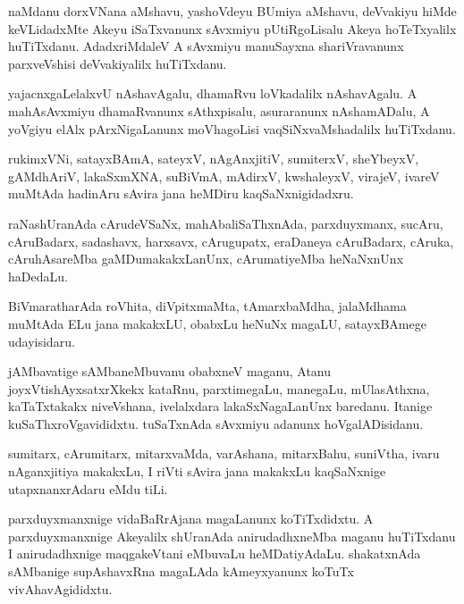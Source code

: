 \documentclass{article}
\begin{document}
\begin{mn}%
naMdanu dorxVNana aMshavu, yashoVdeyu BUmiya aMshavu, deVvakiyu hiMde
keVLidadxMte Akeyu iSaTxvanunx sAvxmiyu pUtiRgoLisalu Akeya
hoTeTxyalilx huTiTxdanu. AdadxriMdaleV A sAvxmiyu manuSayxna
shariVravanunx parxveVshisi deVvakiyalilx huTiTxdanu.
\end{mn}

\begin{mn}
yajacnxgaLelalxvU nAshavAgalu, dhamaRvu loVkadalilx nAshavAgalu. A
mahAsAvxmiyu dhamaRvanunx sAthxpisalu, asuraranunx nAshamADalu, A
yoVgiyu elAlx pArxNigaLanunx moVhagoLisi vaqSiNxvaMshadalilx huTiTxdanu.
\end{mn}

\begin{mn}
rukimxVNi, satayxBAmA, sateyxV, nAgAnxjitiV, sumiterxV, sheYbeyxV,
gAMdhAriV, lakaSxmXNA, suBiVmA, mAdirxV, kwshaleyxV, virajeV, ivareV
muMtAda hadinAru sAvira jana heMDiru kaqSaNxnigidadxru.
\end{mn}

\begin{mn}%
raNashUranAda cArudeVSaNx, mahAbaliSaThxnAda, parxduyxmanx, sucAru,
cAruBadarx, sadashavx, harxsavx, cArugupatx, eraDaneya cAruBadarx,
cAruka, cAruhAsareMba gaMDumakakxLanUnx, cArumatiyeMba heNaNxnUnx haDedaLu.
\end{mn}

\begin{mn}
BiVmaratharAda roVhita, diVpitxmaMta, tAmarxbaMdha, jalaMdhama muMtAda
ELu jana makakxLU, obabxLu heNuNx magaLU, satayxBAmege udayisidaru.
\end{mn}

\begin{mn}%
jAMbavatige sAMbaneMbuvanu obabxneV maganu, Atanu
joyxVtishAyxsatxrXkekx kataRnu, parxtimegaLu, manegaLu, mUlasAthxna,
kaTaTxtakakx niveVshana, ivelalxdara lakaSxNagaLanUnx
baredanu. Itanige kuSaThxroVgavididxtu. tuSaTxnAda sAvxmiyu adanunx hoVgalADisidanu.
\end{mn}

\begin{mn}%
sumitarx, cArumitarx, mitarxvaMda, varAshana, mitarxBahu, suniVtha,
ivaru nAganxjitiya makakxLu, I riVti sAvira jana makakxLu kaqSaNxnige
utapxnanxrAdaru eMdu tiLi.
\end{mn}

\begin{mn}%
parxduyxmanxnige vidaBaRrAjana magaLanunx koTiTxdidxtu. A
parxduyxmanxnige Akeyalilx shUranAda anirudadhxneMba maganu huTiTxdanu
I anirudadhxnige maqgakeVtani eMbuvaLu heMDatiyAdaLu. shakatxnAda
sAMbanige supAshavxRna magaLAda kAmeyxyanunx koTuTx vivAhavAgididxtu.
\end{mn}
\end{document}
